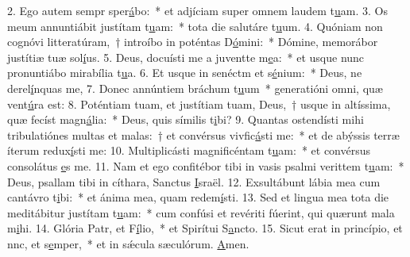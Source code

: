 2. Ego autem sempr sper\uline{á}bo:~* et adjíciam super omnem laudem t\uline{u}am.
3. Os meum annuntiábit justítam t\uline{u}am:~* tota die salutáre t\uline{u}um.
4. Quóniam non cognóvi litteratúram,~† introíbo in poténtas D\uline{ó}mini:~* Dómine, memorábor justítiæ tuæ sol\uline{í}us.
5. Deus, docuísti me a juventte m\uline{e}a:~* et usque nunc pronuntiábo mirabília t\uline{u}a.
6. Et usque in senéctm et s\uline{é}nium:~* Deus, ne derel\uline{í}nquas me,
7. Donec annúntiem bráchum t\uline{u}um~* generatióni omni, quæ vent\uline{ú}ra est:
8. Poténtiam tuam, et justítiam tuam, Deus,~† usque in altíssima, quæ fecíst magn\uline{á}lia:~* Deus, quis símilis t\uline{i}bi?
9. Quantas ostendísti mihi tribulatiónes multas et malas:~† et convérsus vivfic\uline{á}sti me:~* et de abýssis terræ íterum redux\uline{í}sti me:
10. Multiplicásti magnificéntam t\uline{u}am:~* et convérsus consolátus \uline{e}s me.
11. Nam et ego confitébor tibi in vasis psalmi verittem t\uline{u}am:~* Deus, psallam tibi in cíthara, Sanctus \uline{I}sraël.
12. Exsultábunt lábia mea cum cantávro t\uline{i}bi:~* et ánima mea, quam redem\uline{í}sti.
13. Sed et lingua mea tota die meditábitur justítam t\uline{u}am:~* cum confúsi et revériti fúerint, qui quærunt mala m\uline{i}hi.
14. Glória Patr, et F\uline{í}lio,~* et Spirítui S\uline{a}ncto.
15. Sicut erat in princípio, et nnc, et s\uline{e}mper,~* et in sǽcula sæculórum. \uline{A}men.
